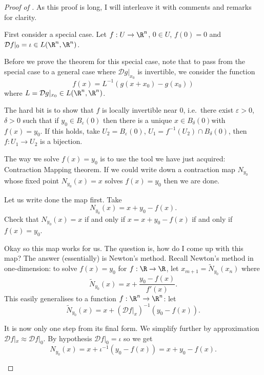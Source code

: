 \documentclass[a4paper]{article}
\newcommand*{\D}{\mathcal{D}}
\theoremstyle{definition}
\begin{document}
\begin{proof}[Proof of ]
  As this proof is long, I will interleave it with comments and remarks for clarity.
  
  First consider a special case. Let \(f: U \to \R^n\), \(0 \in U\), \(f(0) = 0\) and \(\D f|_0 = \iota \in L(\R^n, \R^n)\).

  \begin{remark}
    Before we prove the theorem for this special case, note that to pass from the special case to a general case where \(\D g|_{x_0}\) is invertible, we consider the function
    \[
      f(x) = L^{-1}(g(x + x_0) - g(x_0))
    \]
    where \(L = \D g|_{x_0} \in L(\R^n, \R^n)\).
  \end{remark}

  The hard bit is to show that \(f\) is locally invertible near \(0\), i.e.\ there exist \(\varepsilon > 0\), \(\delta > 0\) such that if \(y_0 \in B_\varepsilon(0)\) then there is a unique \(x \in B_\delta(0)\)with \(f(x) = y_0\). If this holds, take \(U_2 = B_\varepsilon(0)\), \(U_1 = f^{-1}(U_2) \cap B_\delta(0)\), then \(f: U_1 \to U_2\) is a bijection.

  The way we solve \(f(x) = y_0\) is to use the tool we have just acquired: Contraction Mapping theorem. If we could write down a contraction map \(N_{y_0}\) whose fixed point \(N_{y_0}(x) = x\) solves \(f(x) = y_0\) then we are done.

  Let us write done the map first. Take
  \[
    N_{y_0}(x) = x + y_0 - f(x).
  \]
  Check that \(N_{y_0}(x) = x\) if and only if \(x = x + y_0 - f(x)\) if and only if \(f(x) = y_0\).

  \begin{remark}
    Okay so this map works for us. The question is, how do I come up with this map? The answer (essentially) is Newton's method. Recall Newton's method in one-dimension: to solve \(f(x) = y_0\) for \(f: \R \to \R\), let \(x_{m + 1} = \widetilde N_{y_0}(x_n)\) where
    \[
      \widetilde N_{y_0}(x) = x + \frac{y_0 - f(x)}{f'(x)}.
    \]
    This easily generalises to a function \(f: \R^n \to \R^n\): let
    \[
      \widetilde N_{y_0}(x) = x + (\D f|_x)^{-1} (y_0 - f(x)).
    \]

    It is now only one step from its final form. We simplify further by approximation \(\D f|_x \approx \D f|_0\). By hypothesis \(\D f|_0 = \iota\) so we get
    \[
      N_{y_0}(x) = x + \iota^{-1} (y_0 - f(x)) = x + y_0 - f(x).
    \]
  \end{remark}


\end{proof}
\end{document}
